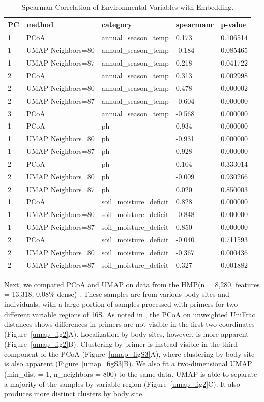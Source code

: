 \begin{table}[]
\caption{Spearman Correlation of Environmental Variables with Embedding.}
\label{umap_table3}
\centering
\begin{tabular}{lllll} \hline
PC & method & category & spearmanr & p-value \\ \hline
1 & PCoA & annual\_season\_temp & 0.173 & 0.106514 \\
1 & UMAP Neighbors=80 & annual\_season\_temp & -0.184 & 0.085465 \\
1 & UMAP Neighbors=87 & annual\_season\_temp & 0.218 & 0.041722 \\
2 & PCoA & annual\_season\_temp & 0.313 & 0.002998 \\
2 & UMAP Neighbors=80 & annual\_season\_temp & 0.478 & 0.000002 \\
2 & UMAP Neighbors=87 & annual\_season\_temp & -0.604 & 0.000000 \\
3 & PCoA & annual\_season\_temp & -0.568 & 0.000000 \\
1 & PCoA & ph & 0.934 & 0.000000 \\
1 & UMAP Neighbors=80 & ph & -0.931 & 0.000000 \\
1 & UMAP Neighbors=87 & ph & 0.928 & 0.000000 \\
2 & PCoA & ph & 0.104 & 0.333014 \\
2 & UMAP Neighbors=80 & ph & -0.009 & 0.930266 \\
2 & UMAP Neighbors=87 & ph & 0.020 & 0.850003 \\
1 & PCoA & soil\_moisture\_deficit & 0.828 & 0.000000 \\
1 & UMAP Neighbors=80 & soil\_moisture\_deficit & -0.848 & 0.000000 \\
1 & UMAP Neighbors=87 & soil\_moisture\_deficit & 0.850 & 0.000000 \\
2 & PCoA & soil\_moisture\_deficit & -0.040 & 0.711593 \\
2 & UMAP Neighbors=80 & soil\_moisture\_deficit & -0.367 & 0.000436 \\
2 & UMAP Neighbors=87 & soil\_moisture\_deficit & 0.327 & 0.001882 \\ \hline
\end{tabular}
\end{table}

	Next, we compared PCoA and UMAP on data from the HMP(n = 8,280, features = 13,318, 0.08\% dense) \cite{The_Human_Microbiome_Project_Consortium2012-og}. These samples are from various body sites and individuals, with a large portion of samples processed with primers for two different variable regions of 16S. As noted in \cite{Debelius2016-ym}, the PCoA on unweighted UniFrac distances shows differences in primers are not visible in the first two coordinates (Figure~\ref{umap_fig2}A). Localization by body sites, however, is more apparent (Figure~\ref{umap_fig2}B). Clustering by primer is instead visible in the third component of the PCoA (Figure~\ref{umap_figS3}A), where clustering by body site is also apparent (Figure~\ref{umap_figS3}B). We also fit a two-dimensional UMAP (min\_dist = 1, n\_neighbors = 800) to the same data. UMAP is able to separate a majority of the samples by variable region (Figure~\ref{umap_fig2}C). It also produces more distinct clusters by body site.

